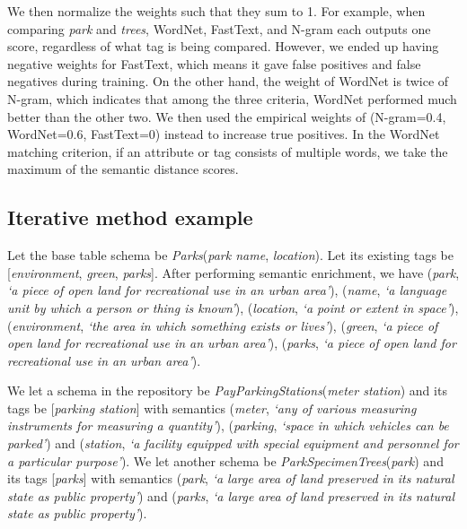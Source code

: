 We then normalize the weights such that they sum to 1. For example, when comparing \textit{park} and \textit{trees}, WordNet, FastText, and N-gram each outputs one score, regardless of what tag is being compared. However, we ended up having negative weights for FastText, which means it gave false positives and false negatives during training. On the other hand, the weight of WordNet is twice of N-gram, which indicates that among the three criteria, WordNet performed much better than the other two. We then used the empirical weights of (N-gram=0.4, WordNet=0.6, FastText=0) instead to increase true positives. In the WordNet matching criterion, if an attribute or tag consists of multiple words, we take the maximum of the semantic distance scores.

\subsection{Iterative method example}
\label{ssec:IterativeMethodExample2}

Let the base table schema be \textit{Parks}(\textit{park name}, \textit{location}). Let its existing tags be [\textit{environment}, \textit{green}, \textit{parks}]. After performing semantic enrichment, we have (\textit{park}, \textit{`a piece of open land for recreational use in an urban area'}), (\textit{name}, \textit{`a language unit by which a person or thing is known'}), (\textit{location}, \textit{`a point or extent in space'}), (\textit{environment}, \textit{`the area in which something exists or lives'}), (\textit{green}, \textit{`a piece of open land for recreational use in an urban area'}), (\textit{parks}, \textit{`a piece of open land for recreational use in an urban area'}).

We let a schema in the repository be \textit{PayParkingStations}(\textit{meter station}) and its tags be [\textit{parking station}] with semantics (\textit{meter}, \textit{`any of various measuring instruments for measuring a quantity'}), (\textit{parking}, \textit{`space in which vehicles can be parked'}) and (\textit{station}, \textit{`a facility equipped with special equipment and personnel for a particular purpose'}). We let another schema be \textit{ParkSpecimenTrees}(\textit{park}) and its tags [\textit{parks}] with semantics (\textit{park}, \textit{`a large area of land preserved in its natural state as public property'}) and (\textit{parks}, \textit{`a large area of land preserved in its natural state as public property'}).

